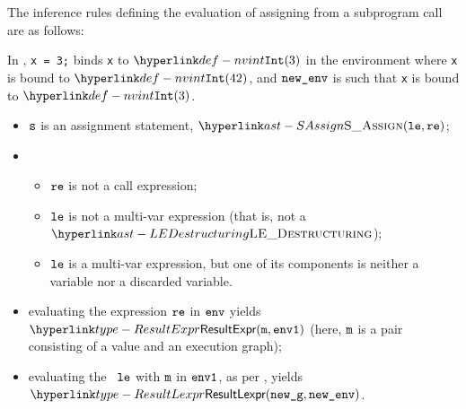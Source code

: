 The inference rules defining the evaluation of assigning
from a subprogram call are as follows:
\begin{mathpar}
\end{mathpar}

In ,
\texttt{x = 3;} binds \texttt{x} to $\nvint(3)$ in the environment where \texttt{x} is bound to
$\nvint(42)$, and $\newenv$ is such that \texttt{x} is bound to $\nvint(3)$.

\ProseParagraph
\AllApply
\begin{itemize}
  \item $\vs$ is an assignment statement, $\SAssign(\vle, \vre)$;
  \item \OneApplies
  \begin{itemize}
    \item $\vre$ is not a call expression;
    \item $\vle$ is not a multi-var expression (that is, not a $\LEDestructuring$);
    \item $\vle$ is a multi-var expression, but one of its components is neither a variable
          nor a discarded variable.
  \end{itemize}
  \item evaluating the expression $\vre$ in $\env$ yields
        $\ResultExpr(\vm, \envone)$ (here, $\vm$ is a pair consisting of a value and an execution graph)\ProseOrAbnormal;
  \item evaluating the \assignableexpression\ $\vle$ with $\vm$ in $\envone$,
        as per , yields $\ResultLexpr(\newg, \newenv)$\ProseOrAbnormal.
\end{itemize}

